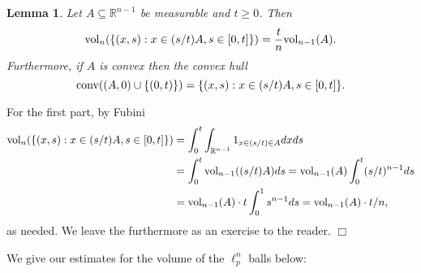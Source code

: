 \documentclass[11pt]{article}
\newtheorem{lemma}[theorem]{Lemma}
\theoremstyle{plain}
\newenvironment{proof}{\noindent {\sc Proof:}}{$\Box$ \medskip}
\theoremstyle{plain}
\newcommand{\set}[1]{\{{#1}\}}
\newcommand{\R}{\ensuremath{\mathbb{R}}}
\newcommand{\vol}{{\rm vol}}
\begin{document}
\begin{lemma} Let $A \subseteq \R^{n-1}$ be measurable and $t \geq 0$. Then
\[
\vol_n(\set{(x,s): x \in (s/t) A, s \in [0,t]}) = \frac{t}{n} {\rm
vol}_{n-1}(A).
\]
Furthermore, if $A$ is convex then the convex hull 
\[
{\rm conv}((A,0) \cup \{(0,t)\}) = \set{(x,s): x \in (s/t) A, s \in [0,t]} .
\]
\label{lem:base-height}
\end{lemma}
\begin{proof}
For the first part, by Fubini
\begin{align*}
\vol_n(\set{(x,s): x \in (s/t) A, s \in [0,t]}) 
&= \int_0^t \int_{\R^{n-1}} 1_{x \in (s/t) \in A} dx ds \\
&= \int_0^t \vol_{n-1}((s/t) A) ds
= \vol_{n-1}(A) \int_0^t (s/t)^{n-1} ds \\
&= \vol_{n-1}(A) \cdot t \int_0^1 s^{n-1} ds
= \vol_{n-1}(A) \cdot t/n ,
\end{align*}
as needed. We leave the furthermore as an exercise to the reader.
\end{proof}

We give our estimates for the volume of the $\ell_p^n$ balls below:
\end{document}
